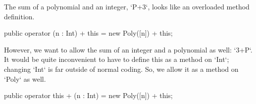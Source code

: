 The sum of a polynomial and an integer, \xcd`P+3`, looks like
an overloaded method definition.  
% 
\begin{xten}
   public operator (n : Int) + this = new Poly([n]) + this;
\end{xten}

% 
%     


However, we want to allow the sum of an integer and a polynomial as well:
\xcd`3+P`.  It would be quite inconvenient to have to define this as a method
on \xcd`Int`; changing \xcd`Int` is far outside of normal coding.  So, we
allow it as a method on \xcd`Poly` as well.


% 
\begin{xten}
   public operator this + (n : Int) = new Poly([n]) + this;
\end{xten}
% 
%     

